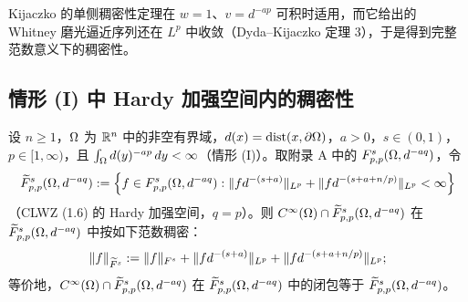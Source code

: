 \begin{remark}[直觉]
Kijaczko 的单侧稠密性定理在 $w=1$、$v=d^{-ap}$ 可积时适用，而它给出的 Whitney 磨光逼近序列还在 $L^p$ 中收敛（Dyda--Kijaczko 定理 3），于是得到完整范数意义下的稠密性。
\end{remark}

\subsection{情形 (I) 中 Hardy 加强空间内的稠密性}

\begin{theorem}[情形 (I)：$p=q$、$s\in(0,1)$ 时 Hardy 加强空间中的稠密性]
设 $n\ge1$，$\Omega$ 为 $\mathbb{R}^n$ 中的非空有界域，$d(x)=\operatorname{dist}(x,\partial\Omega)$，$a>0$，$s\in(0,1)$，$p\in[1,\infty)$，且 $\int_\Omega d(y)^{-ap}\,dy<\infty$（情形 (I)）。取附录 A 中的 $F^s_{p,p}(\Omega,d^{-aq})$，令
\[
  \widetilde F^s_{p,p}(\Omega,d^{-aq})
  :=\Big\{f\in F^s_{p,p}(\Omega,d^{-aq}) :
  \|f d^{-(s+a)}\|_{L^p}+\|f d^{-(s+a+n/p)}\|_{L^p}<\infty\Big\}
\]
（CLWZ (1.6) 的 Hardy 加强空间，$q=p$）。则 $C^\infty(\Omega)\cap\widetilde F^s_{p,p}(\Omega,d^{-aq})$ 在 $\widetilde F^s_{p,p}(\Omega,d^{-aq})$ 中按如下范数稠密：
\[
  \|f\|_{\widetilde F^s}:=\|f\|_{F^s}+\|f d^{-(s+a)}\|_{L^p}+\|f d^{-(s+a+n/p)}\|_{L^p} ;
\]
等价地，$C^\infty(\Omega)\cap\widetilde F^s_{p,p}(\Omega,d^{-aq})$ 在 $\widetilde F^s_{p,p}(\Omega,d^{-aq})$ 中的闭包等于 $\widetilde F^s_{p,p}(\Omega,d^{-aq})$。
\end{theorem}

